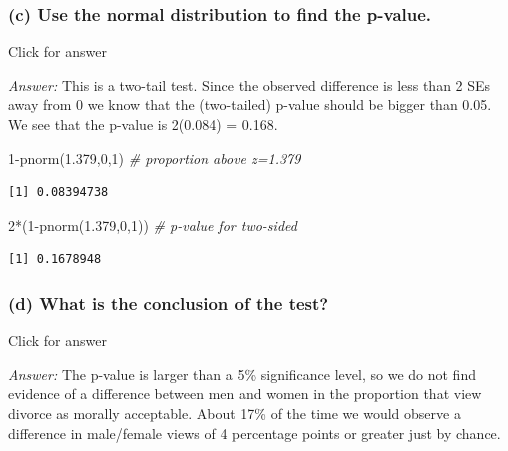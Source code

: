 \documentclass[
]{book}
\newenvironment{Shaded}{\begin{snugshade}}{\end{snugshade}}
\newcommand{\CommentTok}[1]{\textcolor[rgb]{0.56,0.35,0.01}{\textit{#1}}}
\newcommand{\DecValTok}[1]{\textcolor[rgb]{0.00,0.00,0.81}{#1}}
\newcommand{\FloatTok}[1]{\textcolor[rgb]{0.00,0.00,0.81}{#1}}
\newcommand{\FunctionTok}[1]{\textcolor[rgb]{0.00,0.00,0.00}{#1}}
\newcommand{\NormalTok}[1]{#1}
\newcommand{\SpecialCharTok}[1]{\textcolor[rgb]{0.00,0.00,0.00}{#1}}
\begin{document}
\hypertarget{c-use-the-normal-distribution-to-find-the-p-value.-1}{%
\subsubsection{(c) Use the normal distribution to find the p-value.}\label{c-use-the-normal-distribution-to-find-the-p-value.-1}}

Click for answer

\emph{Answer:} This is a two-tail test. Since the observed difference is less than 2 SEs away from 0 we know that the (two-tailed) p-value should be bigger than 0.05. We see that the p-value is 2(0.084) = 0.168.

\begin{Shaded}
\begin{Highlighting}[]
\DecValTok{1}\SpecialCharTok{{-}}\FunctionTok{pnorm}\NormalTok{(}\FloatTok{1.379}\NormalTok{,}\DecValTok{0}\NormalTok{,}\DecValTok{1}\NormalTok{) }\CommentTok{\# proportion above z=1.379}
\end{Highlighting}
\end{Shaded}

\begin{verbatim}
[1] 0.08394738
\end{verbatim}

\begin{Shaded}
\begin{Highlighting}[]
\DecValTok{2}\SpecialCharTok{*}\NormalTok{(}\DecValTok{1}\SpecialCharTok{{-}}\FunctionTok{pnorm}\NormalTok{(}\FloatTok{1.379}\NormalTok{,}\DecValTok{0}\NormalTok{,}\DecValTok{1}\NormalTok{)) }\CommentTok{\# p{-}value for two{-}sided}
\end{Highlighting}
\end{Shaded}

\begin{verbatim}
[1] 0.1678948
\end{verbatim}

\hypertarget{d-what-is-the-conclusion-of-the-test-1}{%
\subsubsection{(d) What is the conclusion of the test?}\label{d-what-is-the-conclusion-of-the-test-1}}

Click for answer

\emph{Answer:} The p-value is larger than a 5\% significance level, so we do not find evidence of a difference between men and women in the proportion that view divorce as morally acceptable. About 17\% of the time we would observe a difference in male/female views of 4 percentage points or greater just by chance.
\end{document}

